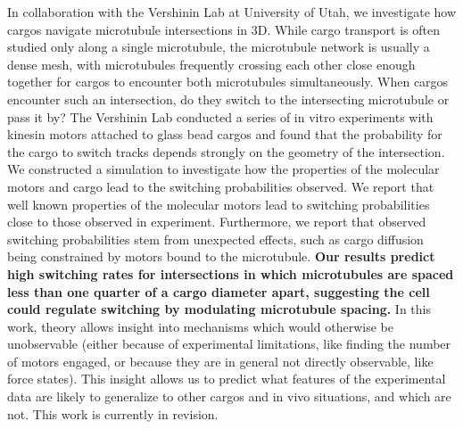 {  In collaboration with the Vershinin Lab at University of Utah, we investigate how cargos navigate microtubule intersections in 3D. While cargo transport is often studied only along a single microtubule, the microtubule network is usually a dense mesh, with microtubules frequently crossing each other close enough together for cargos to encounter both microtubules simultaneously. When cargos encounter such an intersection, do they switch to the intersecting microtubule or pass it by? The Vershinin Lab conducted a series of in vitro experiments with kinesin motors attached to glass bead cargos and found that the probability for the cargo to switch tracks depends strongly on the geometry of the intersection. We constructed a simulation to investigate how the properties of the molecular motors and cargo lead to the switching probabilities observed. We report that well known properties of the molecular motors lead to switching probabilities close to those observed in experiment. Furthermore, we report that observed switching probabilities stem from unexpected effects, such as cargo diffusion being constrained by motors bound to the microtubule. \textbf{Our results predict high switching rates for intersections in which microtubules are spaced less than one quarter of a cargo diameter apart, suggesting the cell could regulate switching by modulating microtubule spacing.} In this work, theory allows insight into mechanisms which would otherwise be unobservable (either because of experimental limitations, like finding the number of motors engaged, or because they are in general not directly observable, like force states). This insight allows us to predict what features of the experimental data are likely to generalize to other cargos and in vivo situations, and which are not. This work is currently in revision.
}


